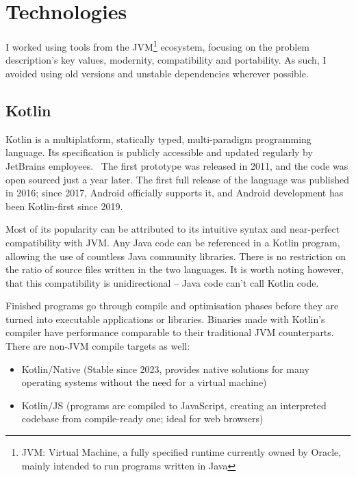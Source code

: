 \chapter{Technologies}

I worked using tools from the JVM\footnote{JVM: \@Java Virtual Machine, a fully specified runtime currently owned by Oracle, mainly intended to run programs written in Java} ecosystem, focusing on the problem description's key values, modernity, compatibility and portability. As such, I avoided using old versions and unstable dependencies wherever possible.

\section{Kotlin}

Kotlin is a multiplatform, statically typed, multi-paradigm programming language. Its specification is publicly accessible and updated regularly by JetBrains employees.~\cite{KotlinSpec} The first prototype was released in 2011, and the code was open sourced just a year later. The first full release of the language was published in 2016; since 2017, Android officially supports it, and Android development has been Kotlin-first since 2019.~\cite{KotlinPast}

Most of its popularity can be attributed to its intuitive syntax and near-perfect compatibility with JVM. Any Java code can be referenced in a Kotlin program, allowing the use of countless Java community libraries. There is no restriction on the ratio of source files written in the two languages. It is worth noting however, that this compatibility is unidirectional -- Java code can't call Kotlin code.

Finished programs go through compile and optimisation phases before they are turned into executable applications or libraries. Binaries made with Kotlin's compiler have performance comparable to their traditional JVM counterparts. There are non-JVM compile targets as well:
\begin{itemize}
    \item Kotlin/Native (Stable since 2023, provides native solutions for many operating systems without the need for a virtual machine)
    \item Kotlin/JS (programs are compiled to JavaScript, creating an interpreted codebase from compile-ready one; ideal for web browsers)
\end{itemize}

